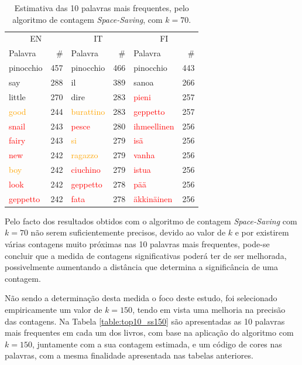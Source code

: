 \documentclass[mirror, portugues]{revdetua}
\begin{document}
\begin{table}[H]
\centering
\caption{Estimativa das 10 palavras mais frequentes, pelo algoritmo de contagem \textit{Space-Saving}, com $k = 70$.}
\label{table:top10_ss70}
\begin{tabular}{lr|lr|lr}
\toprule
\multicolumn{2}{c}{EN} & \multicolumn{2}{c}{IT} & \multicolumn{2}{c}{FI} \\
Palavra & \# & Palavra & \# & Palavra & \# \\
\midrule
pinocchio & 457 & pinocchio & 466 & pinocchio & 443 \\
say & 288 & il & 389 & sanoa & 266 \\
little & 270 & dire & 283 & \textcolor{red}{pieni} & 257 \\
\textcolor{orange}{good} & 244 & \textcolor{orange}{burattino} & 283 & \textcolor{red}{geppetto} & 257 \\
\textcolor{red}{snail} & 243 & \textcolor{red}{pesce} & 280 & \textcolor{red}{ihmeellinen} & 256 \\
\textcolor{red}{fairy} & 243 & \textcolor{orange}{si} & 279 & \textcolor{red}{isä} & 256 \\
\textcolor{red}{new} & 242 & \textcolor{orange}{ragazzo} & 279 & \textcolor{red}{vanha} & 256 \\
\textcolor{orange}{boy} & 242 & \textcolor{red}{ciuchino} & 279 & \textcolor{red}{istua} & 256 \\
\textcolor{red}{look} & 242 & \textcolor{red}{geppetto} & 278 & \textcolor{red}{pää} & 256 \\
\textcolor{red}{geppetto} & 242 & \textcolor{red}{fata} & 278 & \textcolor{red}{äkkinäinen} & 256 \\
\bottomrule
\end{tabular}
\end{table}

Pelo facto dos resultados obtidos com o algoritmo de contagem \textit{Space-Saving} com $k = 70$ não serem suficientemente precisos, devido ao valor de $k$ e por existirem várias contagens muito próximas nas 10 palavras mais frequentes, pode-se concluir que a medida de contagens significativas poderá ter de ser melhorada, possivelmente aumentando a distância que determina a significância de uma contagem.

Não sendo a determinação desta medida o foco deste estudo, foi selecionado empiricamente um valor de $k = 150$, tendo em vista uma melhoria na precisão das contagens. Na Tabela \ref{table:top10_ss150} são apresentadas as 10 palavras mais frequentes em cada um dos livros, com base na aplicação do algoritmo com $k = 150$, juntamente com a sua contagem estimada, e um código de cores nas palavras, com a mesma finalidade apresentada nas tabelas anteriores.
\end{document}
